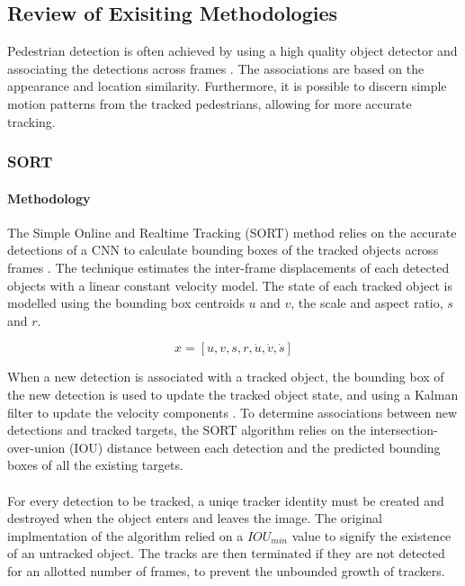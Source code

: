\subsection{Review of Exisiting Methodologies}
 Pedestrian detection is often achieved by using a high quality object detector and associating the detections across frames \cite{Dicle2013}. The associations are based on the appearance and location similarity. Furthermore, it is possible to discern simple motion patterns from the tracked pedestrians, allowing for more accurate tracking.
 
\subsubsection{SORT}
\paragraph{Methodology} The Simple Online and Realtime Tracking (SORT) method relies on the accurate detections of a CNN to calculate bounding boxes of the tracked objects across frames \cite{Bewley2016}. The technique estimates the inter-frame displacements of each detected objects with a linear constant velocity model. The state of each tracked object is modelled using the bounding box centroids $u$ and $v$, the scale and aspect ratio, $s$ and $r$.

\[x = [u, v, s, r, \dot{u}, \dot{v}, \dot{s}] \]

When a new detection is associated with a tracked object, the bounding box of the new detection is used to update the tracked object state, and using a Kalman filter to update the velocity components \cite{Kalman1961}. To determine associations between new detections and tracked targets, the SORT algorithm relies on the intersection-over-union (IOU) distance between each detection and the predicted bounding boxes of all the existing targets.

\paragraph{} For every detection to be tracked, a uniqe tracker identity must be created and destroyed when the object enters and leaves the image. The original implmentation of the algorithm relied on a $IOU_{min}$ value to signify the existence of an untracked object. The tracks are then terminated if they are not detected for an allotted number of frames, to prevent the unbounded growth of trackers.

